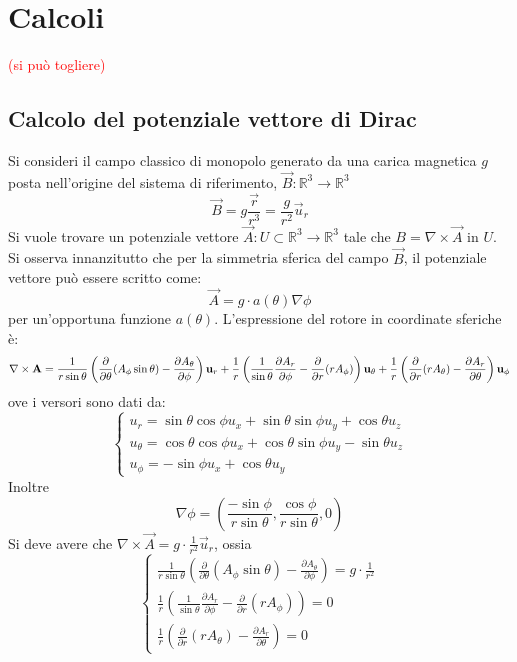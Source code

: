 \section{Calcoli}
\textcolor{red}{(si può togliere)}
\subsection{Calcolo del potenziale vettore di Dirac}
\label{sec:dirac_potential}
Si consideri il campo classico di monopolo generato da una carica magnetica $g$ posta
nell'origine del sistema di riferimento, $\vec B : \mathbb{R} ^3 \to \mathbb{R} ^3$
    $$ \vec B = g\frac{\vec r}{r^3} = \frac{g}{r^2} \vec u _r $$
Si vuole trovare un potenziale vettore $\vec A : U \subset \mathbb{R} ^3 \to \mathbb{R} ^3$ tale che
$ B = \nabla \times \vec A $ in $U$. Si osserva innanzitutto che per la simmetria
sferica del campo $\vec B$, il potenziale vettore può essere scritto come:
   $$ \vec A = g \cdot a(\theta) \nabla \phi $$
per un'opportuna funzione $a(\theta)$.
L'espressione del rotore in coordinate sferiche è:
$$
    \nabla \times \vec A =
         \frac{1}{r\sin\theta} \left(
              \frac{\partial}{\partial\theta}(A_\phi\sin\theta) -
              \frac{\partial A_\theta}{\partial\phi}
              \right) \vec u _r \\
         + \frac{1}{r} \left(
              \frac{1}{\sin\theta}\frac{\partial A_r}{\partial\phi} -
              \frac{\partial}{\partial r}(r A_\phi)
              \right)\vec u _\theta \\
         + \frac{1}{r} \left(
              \frac{\partial}{\partial r}(r A_\theta) - \frac{\partial A_r}{\partial\theta}
              \right)\vec u _\phi
$$
ove i versori sono dati da:
$$
\begin{cases}
    u_r = \sin\theta \cos\phi u_x + \sin\theta \sin\phi u_y + \cos\theta u_z\\
    u_\theta = \cos\theta \cos\phi u_x + \cos\theta \sin\phi u_y - \sin\theta u_z\\
    u_\phi = -\sin\phi u_x + \cos\theta u_y
\end{cases}
$$
Inoltre
$$
   \nabla \phi = \left( \frac{-\sin\phi}{r\sin\theta},\frac{\cos\phi}{r\sin\theta},0 \right)
$$
Si deve avere che $ \nabla \times \vec A = g \cdot \frac{1}{r^2} \vec u _r$,
ossia
$$
\begin{cases}
    \frac{1}{r\sin\theta} \left(
         \frac{\partial}{\partial\theta}(A_\phi\sin\theta) -
         \frac{\partial A_\theta}{\partial\phi}
         \right) = g \cdot \frac{1}{r^2} \\
    \frac{1}{r} \left(
         \frac{1}{\sin\theta}\frac{\partial A_r}{\partial\phi} -
         \frac{\partial}{\partial r}(r A_\phi)
         \right) = 0 \\
    \frac{1}{r} \left(
         \frac{\partial}{\partial r}(r A_\theta) - \frac{\partial A_r}{\partial\theta}
         \right) = 0
\end{cases}
$$
